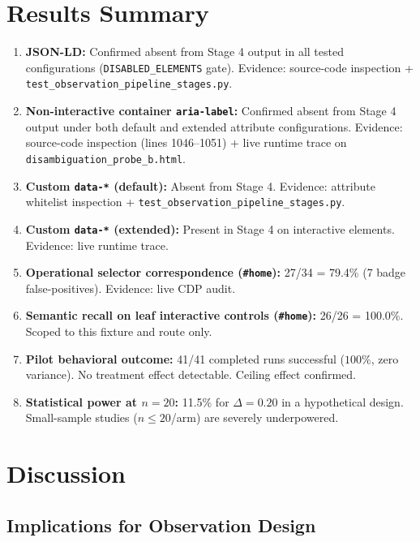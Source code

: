 \documentclass[conference]{IEEEtran}
\begin{document}
\section{Results Summary}
\label{sec:results}

\begin{enumerate}
    \item \textbf{JSON-LD:} Confirmed absent from Stage 4 output in all tested configurations (\texttt{DISABLED\_ELEMENTS} gate). Evidence: source-code inspection + \texttt{test\_observation\_pipeline\_stages.py}.
    \item \textbf{Non-interactive container \texttt{aria-label}:} Confirmed absent from Stage 4 output under both default and extended attribute configurations. Evidence: source-code inspection (lines 1046--1051) + live runtime trace on \texttt{disambiguation\_probe\_b.html}.
    \item \textbf{Custom \texttt{data-*} (default):} Absent from Stage 4. Evidence: attribute whitelist inspection + \texttt{test\_observation\_pipeline\_stages.py}.
    \item \textbf{Custom \texttt{data-*} (extended):} Present in Stage 4 on interactive elements. Evidence: live runtime trace.
    \item \textbf{Operational selector correspondence (\texttt{\#home}):} 27/34 = 79.4\% (7 badge false-positives). Evidence: live CDP audit.
    \item \textbf{Semantic recall on leaf interactive controls (\texttt{\#home}):} 26/26 = 100.0\%. Scoped to this fixture and route only.
    \item \textbf{Pilot behavioral outcome:} 41/41 completed runs successful ($100\%$, zero variance). No treatment effect detectable. Ceiling effect confirmed.
    \item \textbf{Statistical power at $n=20$:} 11.5\% for $\Delta=0.20$ in a hypothetical design. Small-sample studies ($n \le 20$/arm) are severely underpowered.
\end{enumerate}

\section{Discussion}
\label{sec:discussion}

\subsection{Implications for Observation Design}
\end{document}
